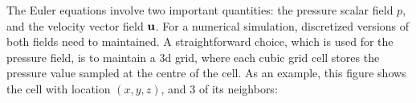 The Euler equations involve two important quantities: the pressure scalar field $p$, and the velocity vector field $\textbf{u}$. For a numerical simulation, discretized versions of both fields need to maintained. A straightforward choice, which is used for the pressure field, is to maintain a 3d grid, where each cubic grid cell stores the pressure value sampled at the centre of the cell. As an example, this figure shows the cell with location $(x,y,z)$, and 3 of its neighbors:


\begin{figure}[!h]
    \centering
    

\end{figure}

